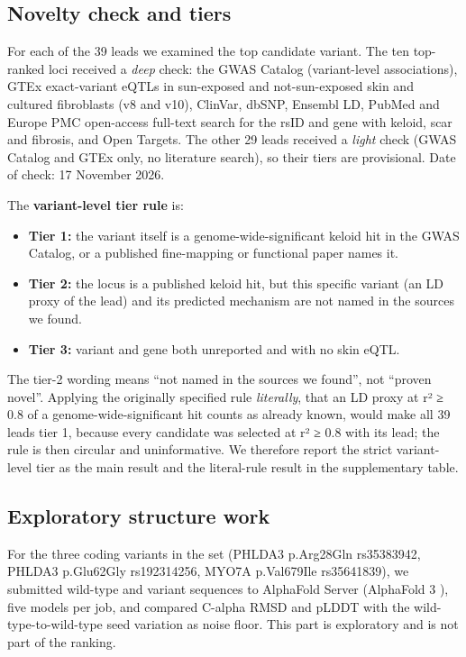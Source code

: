 \documentclass[10pt,twocolumn,a4paper]{article}
\providecommand{\tightlist}{}
\begin{document}
\subsection{Novelty check and tiers}

For each of the 39 leads we examined the top candidate variant. The ten top-ranked loci received a \emph{deep} check: the GWAS Catalog (variant-level associations), GTEx \cite{k22} exact-variant eQTLs in sun-exposed and not-sun-exposed skin and cultured fibroblasts (v8 and v10), ClinVar, dbSNP, Ensembl LD, PubMed and Europe PMC open-access full-text search for the rsID and gene with keloid, scar and fibrosis, and Open Targets. The other 29 leads received a \emph{light} check (GWAS Catalog and GTEx only, no literature search), so their tiers are provisional. Date of check: 17 November 2026.

The \textbf{variant-level tier rule} is:

\begin{itemize}
\tightlist
\item
  \textbf{Tier 1:} the variant itself is a genome-wide-significant keloid hit in the GWAS Catalog, or a published fine-mapping or functional paper names it.
\item
  \textbf{Tier 2:} the locus is a published keloid hit, but this specific variant (an LD proxy of the lead) and its predicted mechanism are not named in the sources we found.
\item
  \textbf{Tier 3:} variant and gene both unreported and with no skin eQTL.
\end{itemize}

The tier-2 wording means ``not named in the sources we found'', not ``proven novel''. Applying the originally specified rule \emph{literally}, that an LD proxy at r² ≥ 0.8 of a genome-wide-significant hit counts as already known, would make all 39 leads tier 1, because every candidate was selected at r² ≥ 0.8 with its lead; the rule is then circular and uninformative. We therefore report the strict variant-level tier as the main result and the literal-rule result in the supplementary table.

\subsection{Exploratory structure work}

For the three coding variants in the set (PHLDA3 p.Arg28Gln rs35383942, PHLDA3 p.Glu62Gly rs192314256, MYO7A p.Val679Ile rs35641839), we submitted wild-type and variant sequences to AlphaFold Server (AlphaFold 3 \cite{k19}), five models per job, and compared C-alpha RMSD and pLDDT with the wild-type-to-wild-type seed variation as noise floor. This part is exploratory and is not part of the ranking.
\end{document}
